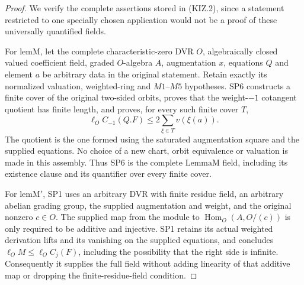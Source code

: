 \begin{proof}
We verify the complete assertions stored in (KIZ.2), since a
statement restricted to one specially chosen application would not
be a proof of these universally quantified fields.

For \(\mathrm{lemM}\), let the complete characteristic-zero DVR
\(O\), algebraically closed valued coefficient field, graded
\(O\)-algebra \(A\), augmentation \(x\), equations \(Q\)
and element \(a\) be arbitrary data in the original statement.
Retain exactly its normalized valuation, weighted-ring and
\(M1\)--\(M5\) hypotheses.  SP6 constructs a finite cover of
the original two-sided orbits, proves that the weight-\(-1\)
cotangent quotient has finite length, and proves, for every such
finite cover \(T\),
\[
 \ell_O C_{-1}(Q.F)
             \le 2\sum_{\xi\in T}v(\xi(a)).
 \tag{KIZ.3}
\]
The quotient is the one formed using the saturated augmentation
square and the supplied equations.  No choice of a new chart,
orbit equivalence or valuation is made in this assembly.  Thus SP6
is the complete \(\mathrm{LemmaM}\) field, including its
existence clause and its quantifier over every finite cover.

For \(\mathrm{lemM'}\), SP1 uses an arbitrary DVR with finite
residue field, an arbitrary abelian grading group, the supplied
augmentation and weight, and the original nonzero \(c\in O\).
The supplied map from the module to
\(\operatorname{Hom}_O(A,O/(c))\) is only required to be
additive and injective.  SP1 retains its actual weighted derivation
lifts and its vanishing on the supplied equations, and concludes
\(\ell_O M\le\ell_O C_j(F)\), including the possibility that
the right side is infinite.  Consequently it supplies the full
field without adding linearity of that additive map or dropping
the finite-residue-field condition.


\end{proof}
